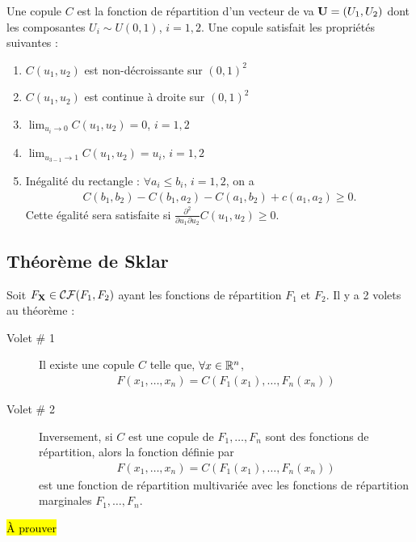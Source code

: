 \documentclass[10pt, french]{article}
\begin{document}
\begin{multicols*}{2}
\begin{definition}
Une copule $C$ est la fonction de répartition d'un vecteur de va $\mathbf{U} = (U_1, U_2)$ dont les composantes $U_i \sim U(0,1)$, $i=1,2$. Une copule satisfait les propriétés suivantes : 
\begin{enumerate}[label=(\arabic*)]
\item $C(u_1, u_2)$ est non-décroissante sur $(0,1)^2$
\item $C(u_1, u_2)$ est continue à droite sur $(0,1)^2$
\item $\lim_{u_i \to 0} C(u_1, u_2) = 0$, $i=1,2$
\item $\lim_{u_{3-1} \to 1} C(u_1, u_2) = u_i$, $i=1,2$
\item Inégalité du rectangle : $\forall a_i \leq b_i$, $i=1,2$, on a
\begin{align*}
C(b_1, b_2) - C(b_1, a_2) - C(a_1, b_2) + c(a_1, a_2) \geq 0.
\end{align*}
Cette égalité sera satisfaite si $\frac{\partial^2}{\partial u_1 \partial u_2} C(u_1, u_2) \geq 0$.
\end{enumerate}
\end{definition}

\subsection{Théorème de Sklar}
\begin{definition}
Soit $F_{\mathbf{X}} \in \mathcal{CF}(F_1, F_2)$ ayant les fonctions de répartition $F_1$ et $F_2$. Il y a 2 volets au théorème : 
\begin{description}
\item[Volet \# 1] Il existe une copule $C$ telle que, $\forall x \in \mathbb{R}^n$,
\begin{align*}
F(x_1, \dots, x_n) = C(F_1(x_1), \dots, F_n(x_n))
\end{align*}

\item[Volet \# 2] Inversement, si $C$ est une copule de $F_1, \dots, F_n$ sont des fonctions de répartition, alors la fonction définie par
\begin{align*}
F(x_1, \dots, x_n) = C(F_1(x_1), \dots, F_n(x_n))
\end{align*}
est une fonction de répartition multivariée avec les fonctions de répartition marginales $F_1, \dots, F_n$.
\end{description}
\hl{À prouver}
\end{definition}


\end{multicols*}
\end{document}
